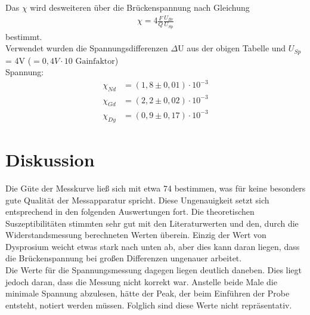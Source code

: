 Das $\chi$ wird desweiteren über die Brückenspannung nach Gleichung
\begin{align*}
\chi = 4 \frac{F}{Q} \frac{U_{Br}}{U_{Sp}}
\end{align*}
bestimmt.\\
Verwendet wurden die Spannungsdifferenzen $\Delta$U aus der obigen Tabelle und $U_{Sp}$ = 4V ($=0,4V \cdot 10 \text{ Gainfaktor} $)\\

Spannung:
\begin{align*}
\chi_{Nd}&=(1,8\pm 0,01)\cdot10^{-3}\\
\chi_{Gd}&=(2,2\pm 0,02)\cdot10^{-3}\\
\chi_{Dy}&=(0,9\pm 0,17)\cdot10^{-3}
\end{align*}

\section{Diskussion}
Die Güte der Messkurve ließ sich mit etwa 74 bestimmen, was für keine besonders gute Qualität der Messapparatur spricht. Diese Ungenauigkeit setzt sich entsprechend in den folgenden Auswertungen fort.
Die theoretischen Suszeptibilitäten stimmten sehr gut mit den Literaturwerten und den, durch die Widerstandsmessung berechneten Werten überein. Einzig der Wert von Dysprosium weicht etwas stark nach unten ab, aber dies kann daran liegen, dass die Brückenspannung bei großen Differenzen ungenauer arbeitet.\\
Die Werte für die Spannungsmessung dagegen liegen deutlich daneben. Dies liegt jedoch daran, dass die Messung nicht korrekt war. Anstelle beide Male die minimale Spannung abzulesen, hätte der Peak, der beim Einführen der Probe entsteht, notiert werden müssen. Folglich sind diese Werte nicht repräsentativ.





